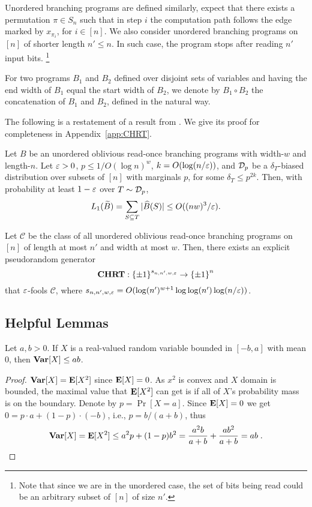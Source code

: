 {\sf Unordered branching programs} are defined similarly, expect that there exists a permutation $\pi \in S_n$ such that in step $i$ the computation path follows the edge marked by $x_{\pi_i}$, for $i\in [n]$.
We also consider unordered branching programs on $[n]$ of shorter length $n'\le n$. In such case, the program stops after reading $n'$ input bits. \footnote{Note that since we are in the unordered case, the set of bits being read could be an arbitrary subset of $[n]$ of size $n'$.}

For two programs $B_1$ and $B_2$ defined over disjoint sets of variables and having the end width of $B_1$ equal the start width of $B_2$, we denote by $B_1 \circ B_2$ the concatenation of $B_1$ and $B_2$, defined in the natural way.




The following is a restatement of a result from \cite{CHRT17}. We give its proof for completeness in Appendix~\ref{app:CHRT}.
\begin{theorem}\label{thm:CHRTa}
Let $B$ be an unordered oblivious read-once branching programs with width-$w$ and length-$n$. Let $\varepsilon>0$, $p \le 1/O(\log n)^w$, $k = O(\log(n/\varepsilon))$, and ${\mathcal{D}}_p$ be a $\delta_T$-biased distribution over subsets of $[n]$ with marginals $p$, 
for some $\delta_T \le p^{2k}$.
Then,
with probability at least $1-\varepsilon$ over $T\sim {\mathcal{D}}_p$, 
\[
L_1(\widetilde{B}) =  \sum_{S \subseteq T}{ |\widehat{B}(S)|} \le O((nw)^3/\varepsilon).\]
\end{theorem}

\begin{theorem}\label{thm:CHRT}
Let $\mathcal{C}$ be the class of all unordered oblivious read-once branching programs on $[n]$ of length at most $n'$ and width at most $w$.
Then,
there exists an explicit pseudorandom generator 
\[
\mathbf{CHRT}:{\{\pm1\}}^{s_{n,n',w,\varepsilon}}\to {\{\pm1\}}^n
\]
that $\varepsilon$-fools $\mathcal{C}$, 
where $s_{n,n',w, \varepsilon} = O(\log(n')^{w+1} \log\log(n') \log(n/\varepsilon))$.
\end{theorem}


\subsection{Helpful Lemmas}

\begin{lemma}\label{lemma:var}
Let $a,b>0$.
If $X$ is a real-valued random variable bounded in $[-b,a]$ with mean $0$, then ${\mathop{\bf Var\/}}[X] \le ab$.
\end{lemma}
	\begin{proof}
		${\mathop{\bf Var\/}}[X] = \mathop{\bf E\/}[X^2]$ since $\mathop{\bf E\/}[X]=0$. As $x^2$ is convex and $X$ domain is bounded, the maximal value that $\mathop{\bf E\/}[X^2]$ can get is if all of $X$'s probability mass is on the boundary. 
		Denote by $p = \Pr[X=a]$.
		Since $\mathop{\bf E\/}[X]=0$ we get $0 = p\cdot a + (1-p) \cdot (-b)$, i.e., $p = b/(a+b)$, thus 
		\[ {\mathop{\bf Var\/}}[X] = \mathop{\bf E\/}[X^2] \le a^2 p + (1-p)b^2 = \frac{a^2 b}{a+b} + \frac{ab^2}{a+b} = ab\;.\qedhere\]
	\end{proof}


